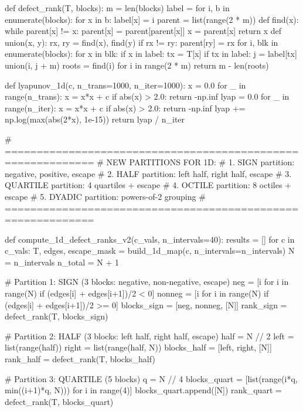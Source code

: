 {{{{{{{{{{{{{def defect_rank(T, blocks):
    m = len(blocks)
    label = {}
    for i, b in enumerate(blocks):
        for x in b:
            label[x] = i
    parent = list(range(2 * m))
    def find(x):
        while parent[x] != x:
            parent[x] = parent[parent[x]]
            x = parent[x]
        return x
    def union(x, y):
        rx, ry = find(x), find(y)
        if rx != ry:
            parent[ry] = rx
    for i, blk in enumerate(blocks):
        for x in blk:
            if x in label:
                tx = T[x]
                if tx in label:
                    j = label[tx]
                    union(i, j + m)
    roots = {find(i) for i in range(2 * m)}
    return m - len(roots)

def lyapunov_1d(c, n_trans=1000, n_iter=1000):
    x = 0.0
    for _ in range(n_trans):
        x = x*x + c
        if abs(x) > 2.0:
            return -np.inf
    lyap = 0.0
    for _ in range(n_iter):
        x = x*x + c
        if abs(x) > 2.0:
            return -np.inf
        lyap += np.log(max(abs(2*x), 1e-15))
    return lyap / n_iter

# ============================================================
# NEW PARTITIONS FOR 1D:
# 1. SIGN partition: {negative}, {positive}, {escape}
# 2. HALF partition: left half, right half, {escape}
# 3. QUARTILE partition: 4 quartiles + escape
# 4. OCTILE partition: 8 octiles + escape
# 5. DYADIC partition: powers-of-2 grouping
# ============================================================

def compute_1d_defect_ranks_v2(c_vals, n_intervals=40):
    results = []
    for c in c_vals:
        T, edges, escape_mask = build_1d_map(c, n_intervals=n_intervals)
        N = n_intervals
        n_total = N + 1
        
        # Partition 1: SIGN (3 blocks: negative, non-negative, escape)
        neg = [i for i in range(N) if (edges[i] + edges[i+1])/2 < 0]
        nonneg = [i for i in range(N) if (edges[i] + edges[i+1])/2 >= 0]
        blocks_sign = [neg, nonneg, [N]]
        rank_sign = defect_rank(T, blocks_sign)
        
        # Partition 2: HALF (3 blocks: left half, right half, escape)
        half = N // 2
        left = list(range(half))
        right = list(range(half, N))
        blocks_half = [left, right, [N]]
        rank_half = defect_rank(T, blocks_half)
        
        # Partition 3: QUARTILE (5 blocks)
        q = N // 4
        blocks_quart = [list(range(i*q, min((i+1)*q, N))) for i in range(4)]
        blocks_quart.append([N])
        rank_quart = defect_rank(T, blocks_quart)
        
}}}}}}}}}}}}}
